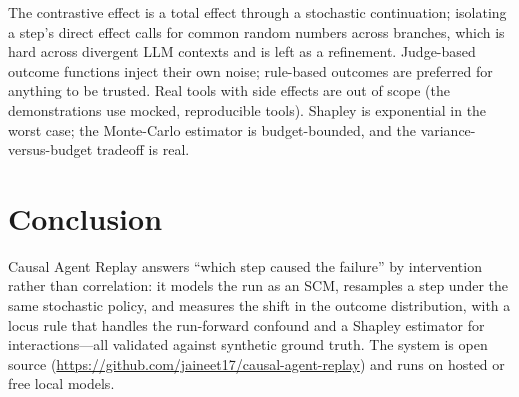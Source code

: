 \documentclass[11pt]{article}
\begin{document}
The contrastive effect is a total effect through a stochastic continuation; isolating a step's
direct effect calls for common random numbers across branches, which is hard across divergent LLM
contexts and is left as a refinement. Judge-based outcome functions inject their own noise;
rule-based outcomes are preferred for anything to be trusted. Real tools with side effects are out
of scope (the demonstrations use mocked, reproducible tools). Shapley is exponential in the worst
case; the Monte-Carlo estimator is budget-bounded, and the variance-versus-budget tradeoff is real.

\section{Conclusion}

Causal Agent Replay answers ``which step caused the failure'' by intervention rather than
correlation: it models the run as an SCM, resamples a step under the same stochastic policy, and
measures the shift in the outcome distribution, with a locus rule that handles the run-forward
confound and a Shapley estimator for interactions---all validated against synthetic ground truth.
The system is open source (\url{https://github.com/jaineet17/causal-agent-replay}) and runs on
hosted or free local models.
\end{document}
